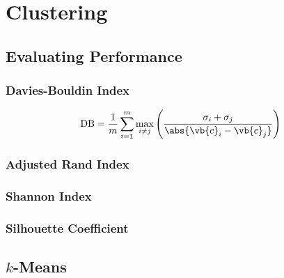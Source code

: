 \chapter{Clustering}
\label{chap:cluster}

\section{Evaluating Performance}
\label{cluster:eval}

\subsection{Davies-Bouldin Index}
\label{cluster:eval:davies_bouldin}

\begin{equation} \label{eq:davies_bouldin}
\text{DB} = \frac{1}{m} \sum_{i=1}^{m} \max_{i \neq j} \left(\frac{\sigma_{i} + \sigma_{j}}{\abs{\vb{c}_{i} - \vb{c}_{j}}}\right)
\end{equation}

\subsection{Adjusted Rand Index}
\label{cluster:eval:adjusted_rand_index}

\subsection{Shannon Index}
\label{cluster:eval:shannon_index}

\subsection{Silhouette Coefficient}
\label{cluster:eval:silhouette}

\section{\texorpdfstring{$k$}{k}-Means}
\label{cluster:kMean}

